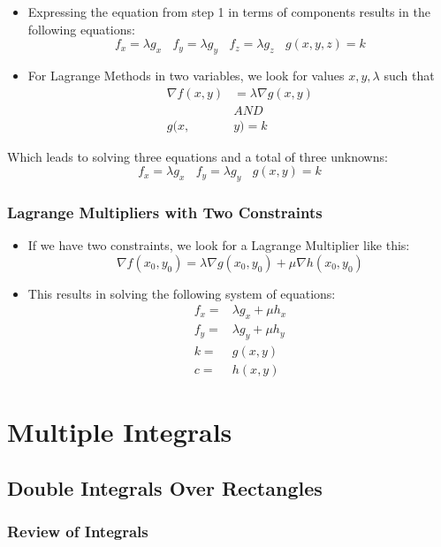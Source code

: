\documentclass{package/notes}
\begin{document}
\begin{itemize}
	\item Expressing the equation from step 1 in terms of components results in the following equations:
	$$f_x = \lambda g_x\:\:\:\:f_y=\lambda g_y\:\:\:\:f_z=\lambda g_z\:\:\:\:g(x,y,z)=k$$
	\item For Lagrange Methods in two variables, we look for values $x,y,\lambda$ such that
	$$\begin{aligned}\nabla f(x,y) &= \lambda \nabla g(x,y)\\
	&AND\\g(x,&y) = k\end{aligned}$$
\end{itemize}

Which leads to solving three equations and a total of three unknowns:
$$f_x = \lambda g_x\:\:\:\:f_y=\lambda g_y\:\:\:\:g(x,y)=k$$


\subsection{Lagrange Multipliers with Two Constraints}

\begin{itemize}
	\item If we have two constraints, we look for a Lagrange Multiplier like this:
	$$\nabla f(x_0,y_0) = \lambda \nabla g(x_0,y_0) + \mu \nabla h(x_0,y_0)$$
	\item This results in solving the following system of equations:
	$$
	\begin{aligned}
		f_x=&\lambda g_x+\mu h_x\\
		f_y =& \lambda g_y + \mu h_y\\
		k =& g(x,y)\\
		c =& h(x,y)
	\end{aligned}
	$$
\end{itemize}

\chapter{Multiple Integrals}


\section{Double Integrals Over Rectangles}


\subsection{Review of Integrals}
\end{document}
